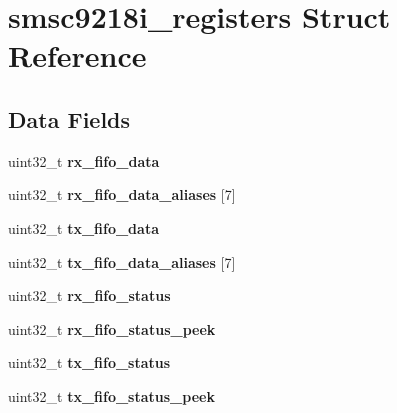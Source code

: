 \hypertarget{structsmsc9218i__registers}{}\section{smsc9218i\+\_\+registers Struct Reference}
\label{structsmsc9218i__registers}
\subsection*{Data Fields}
\begin{DoxyCompactItemize}
\item 
\mbox{\label{structsmsc9218i__registers_ad7d1caca55bae6ee93623853f08a3420}} 
uint32\+\_\+t {\bfseries rx\+\_\+fifo\+\_\+data}
\item 
\mbox{\label{structsmsc9218i__registers_a4295ba7dfd3182b66aad99f8aa76528e}} 
uint32\+\_\+t {\bfseries rx\+\_\+fifo\+\_\+data\+\_\+aliases} \mbox{[}7\mbox{]}
\item 
\mbox{\label{structsmsc9218i__registers_a79a297ad85b3016868f0a5630cfc2eab}} 
uint32\+\_\+t {\bfseries tx\+\_\+fifo\+\_\+data}
\item 
\mbox{\label{structsmsc9218i__registers_ab9a99d0565bde3c4efe59027a599e840}} 
uint32\+\_\+t {\bfseries tx\+\_\+fifo\+\_\+data\+\_\+aliases} \mbox{[}7\mbox{]}
\item 
\mbox{\label{structsmsc9218i__registers_a71832920b9746f6aa97c8aabf21f40db}} 
uint32\+\_\+t {\bfseries rx\+\_\+fifo\+\_\+status}
\item 
\mbox{\label{structsmsc9218i__registers_a4bfa301f2d4f0aee8792e6b64aa3dbcc}} 
uint32\+\_\+t {\bfseries rx\+\_\+fifo\+\_\+status\+\_\+peek}
\item 
\mbox{\label{structsmsc9218i__registers_ad23643b083e582ce781dacf5503fcbbc}} 
uint32\+\_\+t {\bfseries tx\+\_\+fifo\+\_\+status}
\item 
\mbox{\label{structsmsc9218i__registers_a13133fcf284ba018a6147d4e35bdd8e8}} 
uint32\+\_\+t {\bfseries tx\+\_\+fifo\+\_\+status\+\_\+peek}

\end{DoxyCompactItemize}
